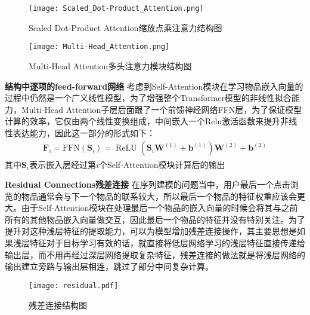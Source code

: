 \begin{figure}[!htb]
   \begin{minipage}{0.48\textwidth}
     \centering
     \texttt{[image: Scaled\_Dot-Product\_Attention.png]} %
     \caption{Scaled Dot-Product Attention缩放点乘注意力结构图}
     \label{Fig:Scaled_Dot-Product_Attention}
   \end{minipage}\hfill
   \begin {minipage}{0.48\textwidth}
     \centering
     \texttt{[image: Multi-Head\_Attention.png]} %
     \caption{Multi-Head Attention多头注意力模块结构图}
     \label{Fig:Multi-Head_Attention}
   \end{minipage}
\end{figure}

\textbf{结构中逐项的feed-forward网络}
考虑到Self-Attention模块在学习物品嵌入向量的过程中仍然是一个广义线性模型，为了增强整个Transformer模型的非线性拟合能力，Multi-Head Attention子层后面跟了一个前馈神经网络FFN层，为了保证模型计算的效率，它仅由两个线性变换组成，中间嵌入一个Relu激活函数来提升非线性表达能力，因此这一部分的形式如下：
\begin{align}
	\mathbf{F}_{i}=\mathrm{FFN}\left(\mathbf{S}_{i}\right)=\operatorname{ReLU}\left(\mathbf{S}_{i} \mathbf{W}^{(1)}+\mathbf{b}^{(1)}\right) \mathbf{W}^{(2)}+\mathbf{b}^{(2)}
\end{align}
其中$\mathbf{S}_{i}$表示嵌入层经过第$i$个Self-Attention模块计算后的输出

\textbf{Residual Connections残差连接}
在序列建模的问题当中，用户最后一个点击浏览的物品通常会与下一个物品的联系较大，所以最后一个物品的特征权重应该会更大。由于Self-Attention模块在处理最后一个物品的嵌入向量的时候会将其与之前所有的其他物品嵌入向量做交互，因此最后一个物品的特征并没有特别关注。为了提升对这种浅层特征的提取能力，可以为模型增加残差连接操作，其主要思想是如果浅层特征对于目标学习有效的话，就直接将低层网络学习的浅层特征直接传递给输出层，而不用再经过深层网络提取复杂特征，残差连接的做法就是将浅层网络的输出建立旁路与输出层相连，跳过了部分中间复杂计算。

\begin{figure}
\centering
\texttt{[image: residual.pdf]}
\caption{残差连接结构图}
\label{residual}
\end{figure}

